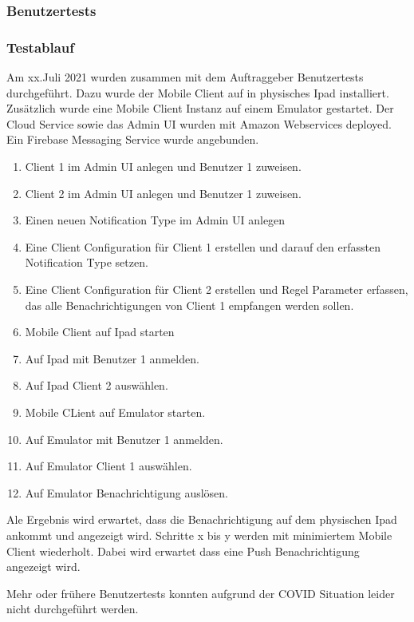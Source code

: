 \subsubsection*{Benutzertests}

\subsubsection*{Testablauf}

Am xx.Juli 2021 wurden zusammen mit dem Auftraggeber Benutzertests durchgeführt.
Dazu wurde der Mobile Client auf in physisches Ipad installiert.
Zusätzlich wurde eine Mobile Client Instanz auf einem Emulator gestartet.
Der Cloud Service sowie das Admin UI wurden mit Amazon Webservices deployed.
Ein Firebase Messaging Service wurde angebunden.

\begin{enumerate}
    \item Client 1 im Admin UI anlegen und Benutzer 1 zuweisen.
    \item Client 2 im Admin UI anlegen und Benutzer 1 zuweisen.
    \item Einen neuen Notification Type im Admin UI anlegen
    \item Eine Client Configuration für Client 1 erstellen und darauf den erfassten Notification Type setzen.
    \item Eine Client Configuration für Client 2 erstellen und Regel Parameter erfassen, das alle Benachrichtigungen von Client 1 empfangen werden sollen.
    \item Mobile Client auf Ipad starten
    \item Auf Ipad mit Benutzer 1 anmelden.
    \item Auf Ipad Client 2 auswählen.
    \item Mobile CLient auf Emulator starten.
    \item Auf Emulator mit Benutzer 1 anmelden.
    \item Auf Emulator Client 1 auswählen.
    \item Auf Emulator Benachrichtigung auslösen.
\end{enumerate}

Ale Ergebnis wird erwartet, dass die Benachrichtigung auf dem physischen Ipad ankommt und angezeigt wird.
Schritte x bis y werden mit minimiertem Mobile Client wiederholt.
Dabei wird erwartet dass eine Push Benachrichtigung angezeigt wird.

Mehr oder frühere Benutzertests konnten aufgrund der COVID Situation leider nicht durchgeführt werden.

